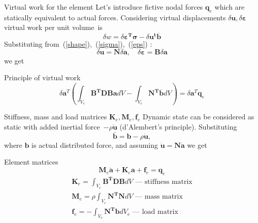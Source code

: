 \documentclass[10pt]{beamer}
\newcommand{\MM}{\mathbf{M}}
\newcommand{\KM}{\mathbf{K}}
\newcommand{\fM}{\mathbf{f}}
\newcommand{\aM}{\mathbf{a}}
\newcommand{\NM}{\mathbf{N}}
\newcommand{\BM}{\mathbf{B}}
\numberwithin{equation}{subsection}
\begin{document}
\begin{frame}{Virtual work for the element}
    Let's introduce fictive nodal forces $\mathbf{q}_e$ which are statically equivalent to actual forces. Considering virtual displacements $\delta \mathbf{u}, \delta \mathbf{\varepsilon}$ 
        virtual work per unit volume~is
    \begin{equation}
        \delta w = \delta\mathbf{\varepsilon^T \sigma} - \delta\mathbf{u^t \overline{b}}
    \end{equation}
    \bigskip
    Substituting from~(\ref{shape}),~(\ref{sigma}),~(\ref{eps}) :
    \begin{equation}
        \delta\mathbf{u} = \NM\delta\aM, \quad \delta \mathbf{\varepsilon} = \BM\delta\aM
    \end{equation}
    we get
    \begin{alertblock}{Principle of virtual work}
        \begin{equation}
            \delta \aM^T  \left(\int_{V_e}\mathbf{B^T D Ba}dV
                        - \int_{V_e} \mathbf{N^T\overline{b}}dV \right) = \delta\aM^T\mathbf{q}_e
        \end{equation}
    \end{alertblock}
\end{frame}

\begin{frame}{Stiffness, mass and load matrices $\KM_e, \mathbf{M}_e, \mathbf{f}_e$}
   Dynamic state can be considered as static with added inertial force~$-\rho \ddot{\mathbf{u}}$ (d'Alembert's principle). Substituting 
   \begin{equation}
       \bar{\mathbf{b}} = \mathbf{b} - \rho\ddot{\mathbf{u}},
   \end{equation}
   where $\mathbf{b}$ is actual distributed force, and assuming $\ddot{\mathbf{u}} = \mathbf{N}\ddot{\aM}$
   we get
   \begin{alertblock}{Element matrices}
   \begin{equation}
        \MM_e\ddot{\aM} + \KM_e\aM + \fM_e = \mathbf{q}_e
   \end{equation}
   \begin{gather}
        \KM_e = \int_{V_e}{\mathbf{B^TDB}}dV
            \text{~---~stiffness matrix}\\
        \MM_e = \rho\int_{V_e}{\mathbf{N^TN}}dV
            \text{~---~mass matrix}\\
        \fM_e = - \int_{V_e} \mathbf{N^Tb}dV_e 
            \text{~---~load matrix}
   \end{gather}
   \end{alertblock}
\end{frame}
\end{document}
